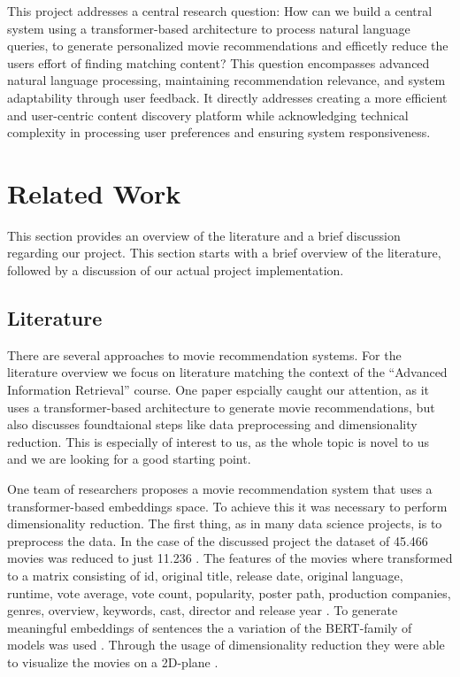 \documentclass[12pt,a4paper]{article}
\begin{document}
This project addresses a central research question:
How can we build a central system using a transformer-based architecture to process natural language queries,
to generate personalized movie recommendations and efficetly reduce the users effort of finding matching content?
\newline \noindent This question encompasses advanced natural language processing, maintaining recommendation relevance, and system
adaptability through user feedback. It directly addresses creating a more efficient and user-centric content discovery
platform while acknowledging technical complexity in processing user preferences and ensuring system responsiveness.

\section{Related Work}

This section provides an overview of the literature and a brief discussion regarding our project.
This section starts with a brief overview of the literature, followed by a discussion of our actual project implementation.

\subsection{Literature}

There are several approaches to movie recommendation systems.
For the literature overview we focus on literature matching the context of the ``Advanced Information Retrieval'' course.
One paper espcially caught our attention, as it uses a transformer-based architecture to generate movie recommendations,
but also discusses foundtaional steps like data preprocessing and dimensionality reduction.
This is especially of interest to us, as the whole topic is novel to us and we are looking for a good starting point.

\noindent One team of researchers \cite{Iglesias-pardo-lopez-quintero-2024} proposes a movie recommendation system that uses a
transformer-based embeddings space. To achieve this it was necessary to perform dimensionality reduction.
The first thing, as in many data science projects, is to preprocess the data.
In the case of the discussed project the dataset of 45.466 movies was reduced to just 11.236 \cite{Iglesias-pardo-lopez-quintero-2024}.
The features of the movies where transformed to a matrix consisting of id, original title, release date,
original language, runtime, vote average, vote count, popularity, poster path, production companies, genres, overview,
keywords, cast, director and release year \cite{Iglesias-pardo-lopez-quintero-2024}.
To generate meaningful embeddings of sentences the a variation of the BERT-family of models was used \cite{Iglesias-pardo-lopez-quintero-2024}.
Through the usage of dimensionality reduction they were able to visualize the movies on a 2D-plane \cite{Iglesias-pardo-lopez-quintero-2024}.
\end{document}
